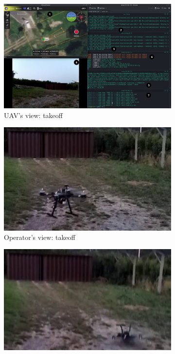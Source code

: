 \begin{figure}[!hbt]
  \centering
  \begin{subfigure}[t]{\textwidth}
    \centering
    \includegraphics[width=1.0\textwidth]{./img/png/uspfs-crash-fpv-takeoff-annot} 
    \caption{UAV's view: takeoff}%
    \label{fig:mission-exec-uspfs-takeoff-1}
  \end{subfigure}
%  
  \begin{subfigure}[t]{0.49\textwidth}
    \centering
    \includegraphics[width=0.98\linewidth]{./img/png/uspfs-crash-myView-takeoff-crop}
    \caption{Operator's view: takeoff}%
    \label{fig:mission-exec-uspfs-takeoff-2}
  \end{subfigure}
  \begin{subfigure}[t]{0.49\textwidth}
    \centering
    \includegraphics[width=\linewidth]{./img/png/uspfs-crash-myView-final-crop}

\end{subfigure}
\end{figure}
